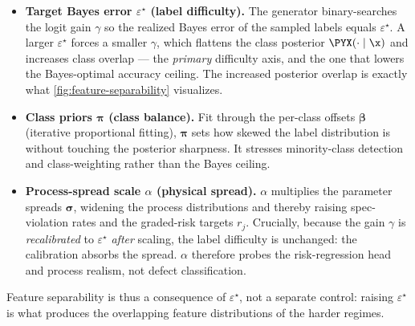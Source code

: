 \begin{itemize}
    \item \textbf{Target Bayes error $\varepsilon^\star$ (label difficulty).}
    The generator binary-searches the logit gain $\gamma$ so the realized Bayes error of
    the sampled labels equals $\varepsilon^\star$. A larger $\varepsilon^\star$ forces a
    smaller $\gamma$, which flattens the class posterior $\PYX(\cdot\mid\x)$ and increases
    class overlap --- the \emph{primary} difficulty axis, and the one that lowers the
    Bayes-optimal accuracy ceiling. The increased posterior overlap is exactly what
    \cref{fig:feature-separability} visualizes.
    \item \textbf{Class priors $\bm\pi$ (class balance).}
    Fit through the per-class offsets $\bm\beta$ (iterative proportional fitting), $\bm\pi$
    sets how skewed the label distribution is without touching the posterior sharpness.
    It stresses minority-class detection and class-weighting rather than the Bayes ceiling.
    \item \textbf{Process-spread scale $\alpha$ (physical spread).}
    $\alpha$ multiplies the parameter spreads $\bm\sigma$, widening the process
    distributions and thereby raising spec-violation rates and the graded-risk targets
    $r_j$. Crucially, because the gain $\gamma$ is \emph{recalibrated} to $\varepsilon^\star$
    \emph{after} scaling, the label difficulty is unchanged: the calibration absorbs the
    spread. $\alpha$ therefore probes the risk-regression head and process realism, not
    defect classification.
\end{itemize}

Feature separability is thus a consequence of $\varepsilon^\star$, not a separate control:
raising $\varepsilon^\star$ is what produces the overlapping feature distributions of the
harder regimes.

